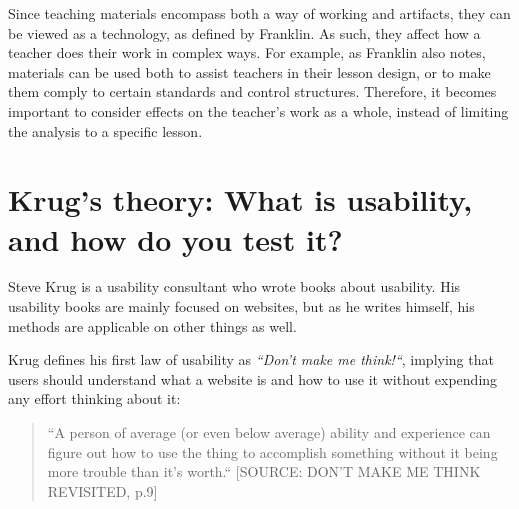 Since teaching materials encompass both a way of working and artifacts, they can be viewed as a technology, as defined by Franklin. As such, they affect how a teacher does their work in complex ways. For example, as Franklin also notes, materials can be used both to assist teachers in their lesson design, or to make them comply to certain standards and control structures. Therefore, it becomes important to consider effects on the teacher's work as a whole, instead of limiting the analysis to a specific lesson.

\section{Krug's theory: What is usability, and how do you test it?}

Steve Krug is a usability consultant who wrote books about usability. His usability books are mainly focused on websites, but as he writes himself, his methods are applicable on other things as well.

Krug defines his first law of usability as \textit{“Don't make me think!“}, implying that users should understand what a website is and how to use it without expending any effort thinking about it:

\begin{quote}
“A person of average (or even below average) ability and experience can figure out how to use the thing to accomplish something without it being more trouble than it's worth.“ [SOURCE: DON'T MAKE ME THINK REVISITED, p.9]
\end{quote}


